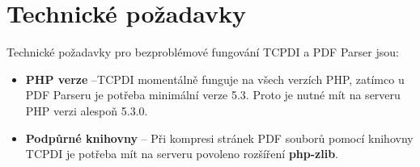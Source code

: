 \section{Technické požadavky}
Technické požadavky pro bezproblémové fungování TCPDI a PDF Parser jsou:
\begin{itemize} 
	\item \textbf{PHP verze} --TCPDI  momentálně funguje na všech verzích PHP, zatímco u PDF Parseru je potřeba minimální verze 5.3. Proto je nutné mít na serveru PHP verzi alespoň 5.3.0.
	\item \textbf{Podpůrné knihovny} -- Při kompresi stránek PDF souborů pomocí knihovny TCPDI je potřeba mít na serveru povoleno rozšíření \textbf{php-zlib}.
\end{itemize}
